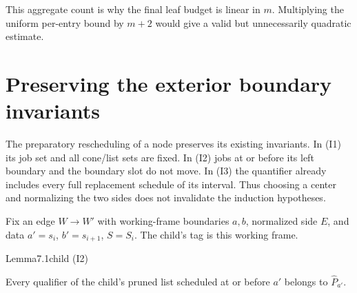 This aggregate count is why the final leaf budget is linear in \(m\). Multiplying the uniform per-entry bound by \(m+2\) would give a valid but unnecessarily quadratic estimate.

\section{Preserving the exterior boundary invariants}

The preparatory rescheduling of a node preserves its existing invariants. In (I1) its job set and all cone/list sets are fixed. In (I2) jobs at or before its left boundary and the boundary slot do not move. In (I3) the quantifier already includes every full replacement schedule of its interval. Thus choosing a center and normalizing the two sides does not invalidate the induction hypotheses.

Fix an edge \(W\to W'\) with working-frame boundaries \(a,b\), normalized side \(E\), and data \(a'=s_i\), \(b'=s_{i+1}\), \(S=S_i\). The child's tag is this working frame.

\begin{numbered}{Lemma}{7.1}{child (I2)}

Every qualifier of the child's pruned list scheduled at or before \(a'\) belongs to \(\widehat P_{a'}\).

\end{numbered}

